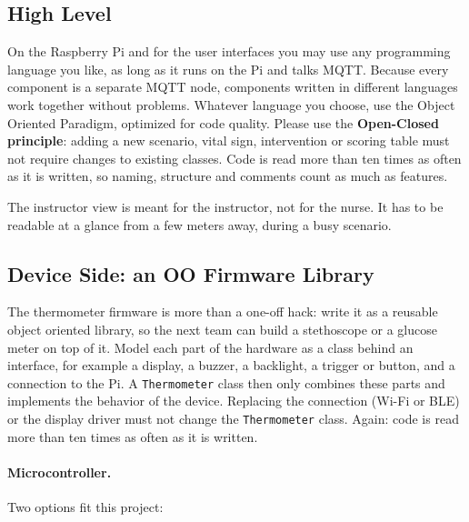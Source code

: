 \documentclass[11pt,a4paper]{article}
\begin{document}
\subsection{High Level}
On the Raspberry Pi and for the user interfaces you may use any programming
language you like, as long as it runs on the Pi and talks MQTT. Because every
component is a separate MQTT node, components written in different languages
work together without problems. Whatever language you choose, use the Object
Oriented Paradigm, optimized for code quality. Please use the \textbf{Open-Closed principle}: adding
a new scenario, vital sign, intervention or scoring table must not require
changes to existing classes. Code is read more than ten times as often as it is
written, so naming, structure and comments count as much as features.

The instructor view is meant for the instructor, not for the nurse. It has to
be readable at a glance from a few meters away, during a busy scenario.

\subsection{Device Side: an OO Firmware Library}
The thermometer firmware is more than a one-off hack: write it as a reusable
object oriented library, so the next team can build a stethoscope or a glucose
meter on top of it. Model each part of the hardware as a class behind an
interface, for example a display, a buzzer, a backlight, a trigger or button,
and a connection to the Pi. A \texttt{Thermometer} class then only combines
these parts and implements the behavior of the device. Replacing the connection
(Wi-Fi or BLE) or the display driver must not change the \texttt{Thermometer}
class. Again: code is read more than ten times as often as it is written.

\paragraph{Microcontroller.} Two options fit this project:
\end{document}
